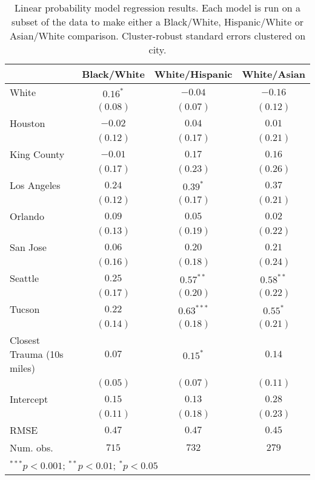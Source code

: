 
\begin{table}[ht!]
\begin{center}
\begin{tabular}{l c c c}
\toprule
 & Black/White & White/Hispanic & White/Asian \\
\midrule
White                      & $0.16^{*}$ & $-0.04$      & $-0.16$     \\
                           & $(0.08)$   & $(0.07)$     & $(0.12)$    \\
Houston                    & $-0.02$    & $0.04$       & $0.01$      \\
                           & $(0.12)$   & $(0.17)$     & $(0.21)$    \\
King County                & $-0.01$    & $0.17$       & $0.16$      \\
                           & $(0.17)$   & $(0.23)$     & $(0.26)$    \\
Los Angeles                & $0.24$     & $0.39^{*}$   & $0.37$      \\
                           & $(0.12)$   & $(0.17)$     & $(0.21)$    \\
Orlando                    & $0.09$     & $0.05$       & $0.02$      \\
                           & $(0.13)$   & $(0.19)$     & $(0.22)$    \\
San Jose                   & $0.06$     & $0.20$       & $0.21$      \\
                           & $(0.16)$   & $(0.18)$     & $(0.24)$    \\
Seattle                    & $0.25$     & $0.57^{**}$  & $0.58^{**}$ \\
                           & $(0.17)$   & $(0.20)$     & $(0.22)$    \\
Tucson                     & $0.22$     & $0.63^{***}$ & $0.55^{*}$  \\
                           & $(0.14)$   & $(0.18)$     & $(0.21)$    \\
Closest Trauma (10s miles) & $0.07$     & $0.15^{*}$   & $0.14$      \\
                           & $(0.05)$   & $(0.07)$     & $(0.11)$    \\
Intercept                  & $0.15$     & $0.13$       & $0.28$      \\
                           & $(0.11)$   & $(0.18)$     & $(0.23)$    \\
\midrule
RMSE                       & $0.47$     & $0.47$       & $0.45$      \\
Num. obs.                  & $715$      & $732$        & $279$       \\
\bottomrule
\multicolumn{4}{l}{\scriptsize{$^{***}p<0.001$; $^{**}p<0.01$; $^{*}p<0.05$}}
\end{tabular}
\caption{Linear probability model regression results. Each model is run on a subset of the data to make either a Black/White, Hispanic/White or Asian/White comparison. Cluster-robust standard errors clustered on city.}
\label{table:regression_all_comparisons_lm}
\end{center}
\end{table}

